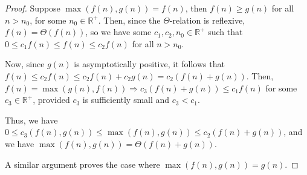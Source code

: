 
\begin{proof}
    Suppose $\max{(f(n), g(n))} = f(n)$, then $f(n) \geq g(n)$ for all $n > n_0$,
    for some $n_0 \in \mathbb{R}^+$. Then, since the $\Theta$-relation is reflexive,
    $f(n) = \Theta(f(n))$, so we have some $c_1, c_2, n_0 \in \mathbb{R}^+$ such that
    $0 \leq c_1 f(n) \leq f(n) \leq c_2 f(n)$ for all $n > n_0$.
    
    Now, since $g(n)$ is asymptotically positive, it follows that 
    $f(n) \leq c_2 f(n) \leq c_2 f(n) + c_2 g(n) = c_2(f(n) + g(n))$.
    Then, $f(n) = \max{(g(n), f(n))} \Rightarrow c_3(f(n) + g(n)) \leq c_1 f(n)$ for
    some $c_3 \in \mathbb{R}^+$, provided $c_3$ is sufficiently small and $c_3 < c_1$.

    Thus, we have $0 \leq c_3(f(n), g(n)) \leq \max{(f(n), g(n))} \leq c_2(f(n) + g(n))$,
    and we have $\max{(f(n), g(n))} = \Theta(f(n) + g(n))$.

    A similar argument proves the case where $\max{(f(n), g(n))} = g(n)$.
\end{proof}
